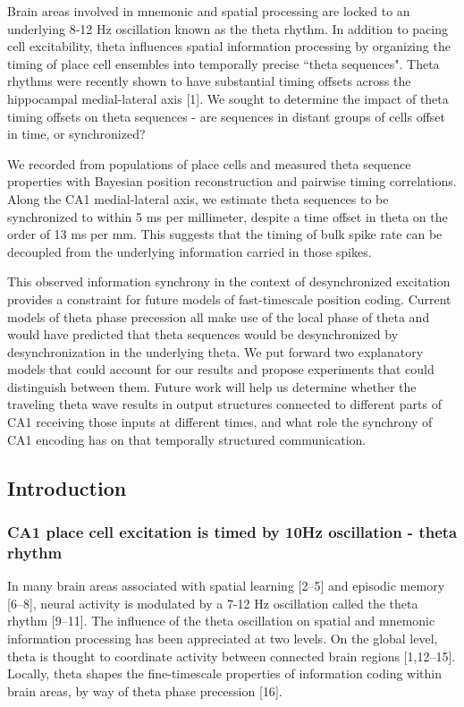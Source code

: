 \documentclass[]{article}
\begin{document}
Brain areas involved in mnemonic and spatial processing are locked to an
underlying 8-12 Hz oscillation known as the theta rhythm. In addition to
pacing cell excitability, theta influences spatial information
processing by organizing the timing of place cell ensembles into
temporally precise ``theta sequences". Theta rhythms were recently shown
to have substantial timing offsets across the hippocampal medial-lateral
axis {[}1{]}. We sought to determine the impact of theta timing offsets
on theta sequences - are sequences in distant groups of cells offset in
time, or synchronized?

We recorded from populations of place cells and measured theta sequence
properties with Bayesian position reconstruction and pairwise timing
correlations. Along the CA1 medial-lateral axis, we estimate theta
sequences to be synchronized to within 5 ms per millimeter, despite a
time offset in theta on the order of 13 ms per mm. This suggests that
the timing of bulk spike rate can be decoupled from the underlying
information carried in those spikes.

This observed information synchrony in the context of desynchronized
excitation provides a constraint for future models of fast-timescale
position coding. Current models of theta phase precession all make use
of the local phase of theta and would have predicted that theta
sequences would be desynchronized by desynchronization in the underlying
theta. We put forward two explanatory models that could account for our
results and propose experiments that could distinguish between them.
Future work will help us determine whether the traveling theta wave
results in output structures connected to different parts of CA1
receiving those inputs at different times, and what role the synchrony
of CA1 encoding has on that temporally structured communication.

\subsection{Introduction}

\subsubsection{CA1 place cell excitation is timed by 10Hz oscillation -
theta rhythm}

In many brain areas associated with spatial learning {[}2--5{]} and
episodic memory {[}6--8{]}, neural activity is modulated by a 7-12 Hz
oscillation called the theta rhythm {[}9--11{]}. The influence of the
theta oscillation on spatial and mnemonic information processing has
been appreciated at two levels. On the global level, theta is thought to
coordinate activity between connected brain regions {[}1,12--15{]}.
Locally, theta shapes the fine-timescale properties of information
coding within brain areas, by way of theta phase precession {[}16{]}.
\end{document}
